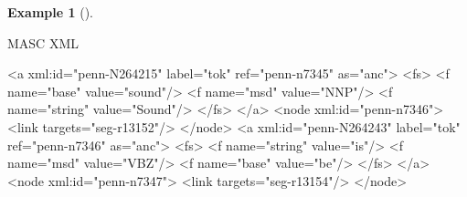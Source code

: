 \documentclass[
  letterpaper,
]{latex/krantz}
\newenvironment{Shaded}{\begin{snugshade}}{\end{snugshade}}
\newcommand{\KeywordTok}[1]{\textcolor[rgb]{0.00,0.00,0.00}{#1}}
\newcommand{\NormalTok}[1]{\textcolor[rgb]{0.00,0.00,0.00}{#1}}
\newcommand{\OtherTok}[1]{\textcolor[rgb]{0.00,0.00,0.00}{#1}}
\newcommand{\StringTok}[1]{\textcolor[rgb]{0.00,0.00,0.00}{#1}}
\theoremstyle{definition}
\newtheorem{example}{Example}[chapter]
\theoremstyle{remark}
\begin{document}
\begin{example}[]\protect\hypertarget{exm-masc-xml}{}\label{exm-masc-xml}

MASC XML

\begin{Shaded}
\begin{Highlighting}[]
\NormalTok{\textless{}}\KeywordTok{a}\OtherTok{ xml:id=}\StringTok{"penn{-}N264215"}\OtherTok{ label=}\StringTok{"tok"}\OtherTok{ ref=}\StringTok{"penn{-}n7345"}\OtherTok{ as=}\StringTok{"anc"}\NormalTok{\textgreater{}}
\NormalTok{  \textless{}}\KeywordTok{fs}\NormalTok{\textgreater{}}
\NormalTok{    \textless{}}\KeywordTok{f}\OtherTok{ name=}\StringTok{"base"}\OtherTok{ value=}\StringTok{"sound"}\NormalTok{/\textgreater{}}
\NormalTok{    \textless{}}\KeywordTok{f}\OtherTok{ name=}\StringTok{"msd"}\OtherTok{ value=}\StringTok{"NNP"}\NormalTok{/\textgreater{}}
\NormalTok{    \textless{}}\KeywordTok{f}\OtherTok{ name=}\StringTok{"string"}\OtherTok{ value=}\StringTok{"Sound"}\NormalTok{/\textgreater{}}
\NormalTok{  \textless{}/}\KeywordTok{fs}\NormalTok{\textgreater{}}
\NormalTok{\textless{}/}\KeywordTok{a}\NormalTok{\textgreater{}}
\NormalTok{\textless{}}\KeywordTok{node}\OtherTok{ xml:id=}\StringTok{"penn{-}n7346"}\NormalTok{\textgreater{}}
\NormalTok{  \textless{}}\KeywordTok{link}\OtherTok{ targets=}\StringTok{"seg{-}r13152"}\NormalTok{/\textgreater{}}
\NormalTok{\textless{}/}\KeywordTok{node}\NormalTok{\textgreater{}}
\NormalTok{\textless{}}\KeywordTok{a}\OtherTok{ xml:id=}\StringTok{"penn{-}N264243"}\OtherTok{ label=}\StringTok{"tok"}\OtherTok{ ref=}\StringTok{"penn{-}n7346"}\OtherTok{ as=}\StringTok{"anc"}\NormalTok{\textgreater{}}
\NormalTok{  \textless{}}\KeywordTok{fs}\NormalTok{\textgreater{}}
\NormalTok{    \textless{}}\KeywordTok{f}\OtherTok{ name=}\StringTok{"string"}\OtherTok{ value=}\StringTok{"is"}\NormalTok{/\textgreater{}}
\NormalTok{    \textless{}}\KeywordTok{f}\OtherTok{ name=}\StringTok{"msd"}\OtherTok{ value=}\StringTok{"VBZ"}\NormalTok{/\textgreater{}}
\NormalTok{    \textless{}}\KeywordTok{f}\OtherTok{ name=}\StringTok{"base"}\OtherTok{ value=}\StringTok{"be"}\NormalTok{/\textgreater{}}
\NormalTok{  \textless{}/}\KeywordTok{fs}\NormalTok{\textgreater{}}
\NormalTok{\textless{}/}\KeywordTok{a}\NormalTok{\textgreater{}}
\NormalTok{\textless{}}\KeywordTok{node}\OtherTok{ xml:id=}\StringTok{"penn{-}n7347"}\NormalTok{\textgreater{}}
\NormalTok{  \textless{}}\KeywordTok{link}\OtherTok{ targets=}\StringTok{"seg{-}r13154"}\NormalTok{/\textgreater{}}
\NormalTok{\textless{}/}\KeywordTok{node}\NormalTok{\textgreater{}}
\end{Highlighting}
\end{Shaded}

\end{example}
\end{document}
